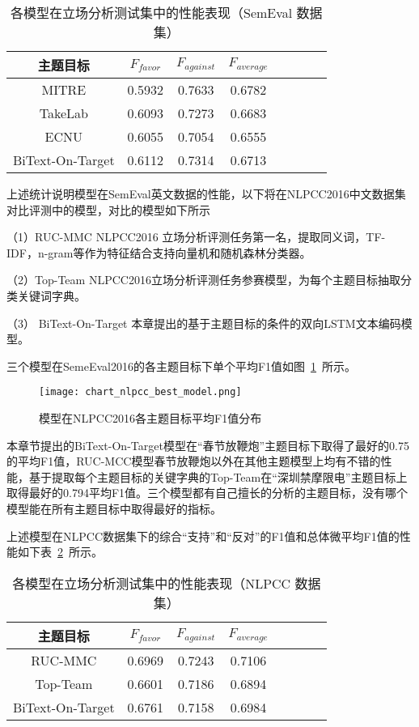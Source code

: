 \begin{table}[htbp]
	\caption[table123]{各模型在立场分析测试集中的性能表现（SemEval 数据集）}
	\vspace{0.5em}\centering\wuhao
	\label{semeval_res}
	\begin{tabular}{cccccccc}
		\toprule[1.5pt]
		主题目标& $F_{favor}$&$F_{against}$&$F_{average}$ \\
		\midrule[1pt]
		MITRE&0.5932&0.7633&0.6782\\
		TakeLab&0.6093&0.7273&0.6683\\
		ECNU&0.6055&0.7054&0.6555\\
		BiText-On-Target&0.6112&0.7314&0.6713\\
		\bottomrule[1.5pt]
	\end{tabular}
\end{table}

上述统计说明模型在SemEval英文数据的性能，以下将在NLPCC2016中文数据集对比评测中的模型，对比的模型如下所示

（1）RUC-MMC NLPCC2016 立场分析评测任务第一名，提取同义词，TF-IDF，n-gram等作为特征结合支持向量机和随机森林分类器。

（2）Top-Team NLPCC2016立场分析评测任务参赛模型，为每个主题目标抽取分类关键词字典。

（3） BiText-On-Target 本章提出的基于主题目标的条件的双向LSTM文本编码模型。

三个模型在SemeEval2016的各主题目标下单个平均F1值如图~\ref{chart_nlpcc_best_model}~所示。
\begin{figure}[htbp]
	\centering
	\texttt{[image: chart\_nlpcc\_best\_model.png]}
	\caption[rnn_vanish]{模型在NLPCC2016各主题目标平均F1值分布}
	\label{chart_nlpcc_best_model}
\end{figure}

本章节提出的BiText-On-Target模型在“春节放鞭炮”主题目标下取得了最好的0.75的平均F1值，RUC-MCC模型春节放鞭炮以外在其他主题模型上均有不错的性能，基于提取每个主题目标的关键字典的Top-Team在“深圳禁摩限电”主题目标上取得最好的0.794平均F1值。三个模型都有自己擅长的分析的主题目标，没有哪个模型能在所有主题目标中取得最好的指标。

上述模型在NLPCC数据集下的综合“支持”和“反对”的F1值和总体微平均F1值的性能如下表~\ref{nlpcc_res}~所示。
\begin{table}[htbp]
	\caption[table123]{各模型在立场分析测试集中的性能表现（NLPCC 数据集）}
	\label{nlpcc_res}
	\vspace{0.5em}\centering\wuhao
	\begin{tabular}{cccccccc}
		\toprule[1.5pt]
		主题目标& $F_{favor}$&$F_{against}$&$F_{average}$ \\
		\midrule[1pt]
		RUC-MMC&0.6969&0.7243&0.7106\\
		Top-Team&0.6601&0.7186&0.6894\\
		BiText-On-Target&0.6761&0.7158&0.6984\\
		\bottomrule[1.5pt]
	\end{tabular}
\end{table}

